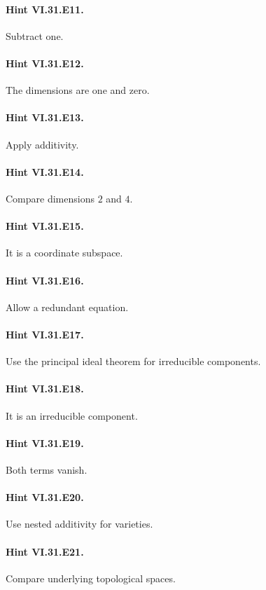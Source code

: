 \paragraph{Hint VI.31.E11.} Subtract one.

\paragraph{Hint VI.31.E12.} The dimensions are one and zero.

\paragraph{Hint VI.31.E13.} Apply additivity.

\paragraph{Hint VI.31.E14.} Compare dimensions $2$ and $4$.

\paragraph{Hint VI.31.E15.} It is a coordinate subspace.

\paragraph{Hint VI.31.E16.} Allow a redundant equation.

\paragraph{Hint VI.31.E17.} Use the principal ideal theorem for irreducible components.

\paragraph{Hint VI.31.E18.} It is an irreducible component.

\paragraph{Hint VI.31.E19.} Both terms vanish.

\paragraph{Hint VI.31.E20.} Use nested additivity for varieties.

\paragraph{Hint VI.31.E21.} Compare underlying topological spaces.

